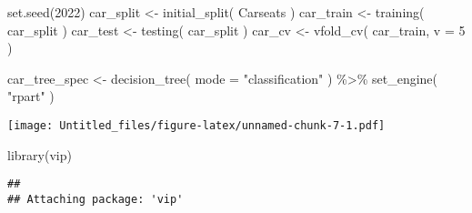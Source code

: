 \documentclass[
]{article}
\newenvironment{Shaded}{\begin{snugshade}}{\end{snugshade}}
\newcommand{\AttributeTok}[1]{\textcolor[rgb]{0.77,0.63,0.00}{#1}}
\newcommand{\DecValTok}[1]{\textcolor[rgb]{0.00,0.00,0.81}{#1}}
\newcommand{\FunctionTok}[1]{\textcolor[rgb]{0.00,0.00,0.00}{#1}}
\newcommand{\NormalTok}[1]{#1}
\newcommand{\OtherTok}[1]{\textcolor[rgb]{0.56,0.35,0.01}{#1}}
\newcommand{\SpecialCharTok}[1]{\textcolor[rgb]{0.00,0.00,0.00}{#1}}
\newcommand{\StringTok}[1]{\textcolor[rgb]{0.31,0.60,0.02}{#1}}
\begin{document}
\begin{Shaded}
\begin{Highlighting}[]
\FunctionTok{set.seed}\NormalTok{(}\DecValTok{2022}\NormalTok{) }
\NormalTok{car\_split }\OtherTok{\textless{}{-}} \FunctionTok{initial\_split}\NormalTok{( Carseats ) }
\NormalTok{car\_train }\OtherTok{\textless{}{-}} \FunctionTok{training}\NormalTok{( car\_split ) }
\NormalTok{car\_test }\OtherTok{\textless{}{-}} \FunctionTok{testing}\NormalTok{( car\_split ) }
\NormalTok{car\_cv }\OtherTok{\textless{}{-}} \FunctionTok{vfold\_cv}\NormalTok{( car\_train, }\AttributeTok{v =} \DecValTok{5}\NormalTok{ )}
\end{Highlighting}
\end{Shaded}

\begin{Shaded}
\begin{Highlighting}[]
\NormalTok{car\_tree\_spec }\OtherTok{\textless{}{-}} \FunctionTok{decision\_tree}\NormalTok{( }\AttributeTok{mode =} \StringTok{"classification"}\NormalTok{ ) }\SpecialCharTok{\%\textgreater{}\%} \FunctionTok{set\_engine}\NormalTok{( }\StringTok{"rpart"}\NormalTok{ )}
\end{Highlighting}
\end{Shaded}

\begin{Shaded}
\end{Shaded}

\texttt{[image: Untitled\_files/figure-latex/unnamed-chunk-7-1.pdf]}

\begin{Shaded}
\begin{Highlighting}[]
\FunctionTok{library}\NormalTok{(vip) }
\end{Highlighting}
\end{Shaded}

\begin{verbatim}
## 
## Attaching package: 'vip'
\end{verbatim}
\end{document}
